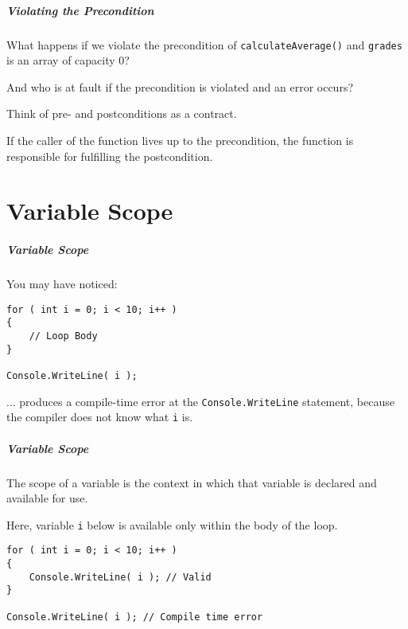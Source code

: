 \begin{frame}
\frametitle{Violating the Precondition}
What happens if we violate the precondition of \texttt{calculateAverage()} and \texttt{grades} is an array of capacity 0?

And who is at fault if the precondition is violated and an error occurs?

Think of pre- and postconditions as a contract. 

If the caller of the function lives up to the precondition, the function is responsible for fulfilling the postcondition.

\end{frame}

\part{Variable Scope}
\begin{frame}\partpage\end{frame}


\begin{frame}[fragile]
\frametitle{Variable Scope}
You may have noticed:

\begin{verbatim}
for ( int i = 0; i < 10; i++ )
{
    // Loop Body
}

Console.WriteLine( i );
\end{verbatim}

... produces a compile-time error at the \texttt{Console.WriteLine} statement, because the compiler does not know what \texttt{i} is.

\end{frame}

\begin{frame}[fragile]
\frametitle{Variable Scope}
The \alert{scope} of a variable is the context in which that variable is declared and available for use.

Here, variable \texttt{i} below is available only within the body of the loop.

\begin{verbatim}
for ( int i = 0; i < 10; i++ )
{
    Console.WriteLine( i ); // Valid
}

Console.WriteLine( i ); // Compile time error
\end{verbatim}

\end{frame}

